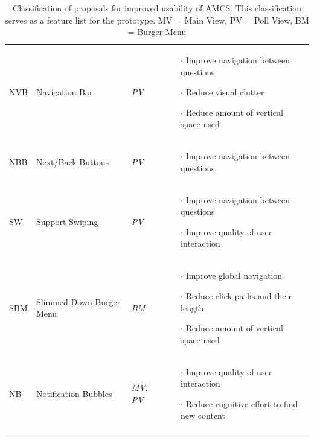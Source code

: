 \begin{small}
\begin{longtable}{ p{0.7cm} p{3.8cm} p{1cm} p{7.6cm}}
		NVB & Navigation Bar & \emph{PV} &
		\vspace{-0.45cm}	
		\begin{itemize}[leftmargin=*, noitemsep, topsep=0pt]
			\item[$\cdot$] Improve navigation between questions
			\item[$\cdot$] Reduce visual clutter
			\item[$\cdot$] Reduce amount of vertical space used
		\end{itemize} \vspace{-0.45cm} \\
		NBB & Next/Back Buttons & \emph{PV} &
		\begin{itemize}[leftmargin=*, noitemsep, topsep=0pt]
			\item[$\cdot$] Improve navigation between questions
		\end{itemize} \vspace{-0.45cm} \\ 
		SW & Support Swiping & \emph{PV} &
		\vspace{-0.45cm}	
		\begin{itemize}[leftmargin=*, noitemsep, topsep=0pt]
			\item[$\cdot$] Improve navigation between questions
			\item[$\cdot$] Improve quality of user interaction
		\end{itemize} \vspace{-0.45cm} \\ 
		SBM & Slimmed Down Burger Menu & \emph{BM} & 		\vspace{-0.45cm}	
		\begin{itemize}[leftmargin=*, noitemsep, topsep=0pt]
			\item[$\cdot$] Improve global navigation
			\item[$\cdot$] Reduce click paths and their length
			\item[$\cdot$] Reduce amount of vertical space used
		\end{itemize} \vspace{-0.45cm} \\ 
		NB & Notification Bubbles & \emph{MV}, \newline \emph{PV} &
		\vspace{-0.45cm}	
		\begin{itemize}[leftmargin=*, noitemsep, topsep=0pt]
			\item[$\cdot$] Improve quality of user interaction
			\item[$\cdot$] Reduce cognitive effort to find new content
		\end{itemize} \vspace{-0.45cm} \\ \hline
		\caption{Classification of proposals for improved usability of AMCS. This classification serves as a feature list for the prototype. MV = Main View, PV = Poll View, BM = Burger Menu}
		\label{tab:proposals}
	\end{longtable}
\end{small}
